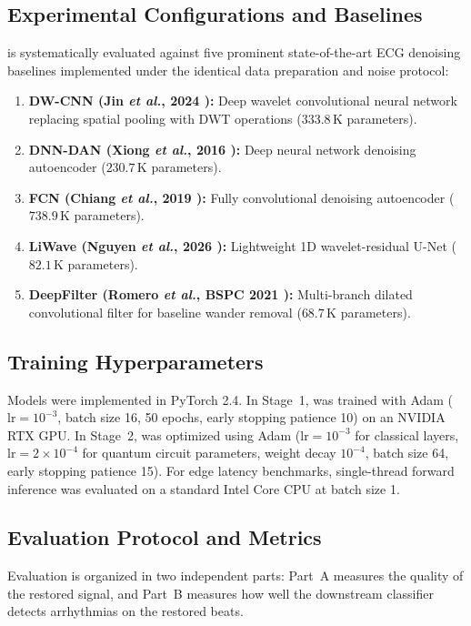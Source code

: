 \subsection{Experimental Configurations and Baselines}
\HSL{} is systematically evaluated against five prominent state-of-the-art ECG denoising baselines implemented under the identical data preparation and noise protocol:
\begin{enumerate}
    \item \textbf{DW-CNN (Jin \emph{et al.}, 2024 \cite{jin2024}):} Deep wavelet convolutional neural network replacing spatial pooling with DWT operations ($333.8$\,K parameters).
    \item \textbf{DNN-DAN (Xiong \emph{et al.}, 2016 \cite{xiong2016}):} Deep neural network denoising autoencoder ($230.7$\,K parameters).
    \item \textbf{FCN (Chiang \emph{et al.}, 2019 \cite{chiang2019}):} Fully convolutional denoising autoencoder ($738.9$\,K parameters).
    \item \textbf{LiWave (Nguyen \emph{et al.}, 2026 \cite{nguyen2026liwave}):} Lightweight 1D wavelet-residual U-Net ($82.1$\,K parameters).
    \item \textbf{DeepFilter (Romero \emph{et al.}, BSPC 2021 \cite{romero2021}):} Multi-branch dilated convolutional filter for baseline wander removal ($68.7$\,K parameters).
\end{enumerate}

\subsection{Training Hyperparameters}
Models were implemented in PyTorch 2.4. In Stage~1, \HSL{} was trained with Adam ($\text{lr} = 10^{-3}$, batch size 16, 50 epochs, early stopping patience 10) on an NVIDIA RTX GPU. In Stage~2, \RRN{} was optimized using Adam ($\text{lr} = 10^{-3}$ for classical layers, $\text{lr} = 2 \times 10^{-4}$ for quantum circuit parameters, weight decay $10^{-4}$, batch size 64, early stopping patience 15). For edge latency benchmarks, single-thread forward inference was evaluated on a standard Intel Core CPU at batch size 1.

\subsection{Evaluation Protocol and Metrics}
Evaluation is organized in two independent parts: Part~A measures the quality of the restored signal, and Part~B measures how well the downstream classifier detects arrhythmias on the restored beats.

